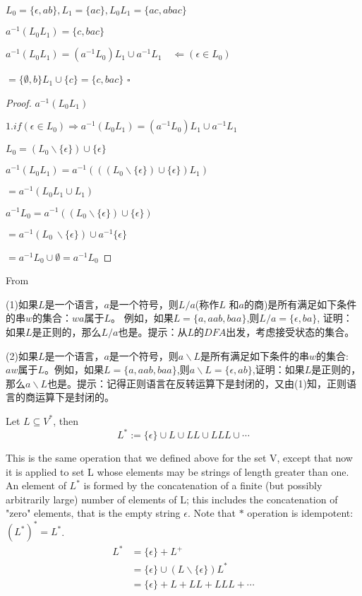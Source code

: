 \begin{example}
	$L_0 = \{\epsilon,ab\},L_1 = \{ac\}, L_0L_1 = \{ac,abac\}$
	
	$a^{-1}(L_0L_1) = \{c,bac\}$
	
	$a^{-1}(L_0L_1) = (a^{-1}L_0)L_1 \cup a^{-1}L_1 \quad\Leftarrow(\epsilon \in L_0)$
	
	$= \{\emptyset,b\}L_1 \cup \{c\} = \{c,bac\}$ \hfill$\square$
\end{example}

\begin{proof}
	$a^{-1}(L_0L_1)$
	
	$1. if(\epsilon \in L_0) \Rightarrow a^{-1}(L_0L_1) = (a^{-1}L_0)L_1 \cup a^{-1}L_1 $
	
	$L_0 = (L_0 \backslash \{\epsilon\}) \cup \{\epsilon\}$
	
	$a^{-1}(L_0L_1) = a^{-1}(((L_0 \backslash \{\epsilon\}) \cup \{\epsilon\})L_1)$
	
	$=a^{-1}(L_0L_1\cup L_1)$
	
	$a^{-1}L_0 = a^{-1}((L_0 \backslash \{\epsilon\}) \cup \{\epsilon\})$
	
	$=a^{-1}(L_0\ \backslash \{\epsilon \}) \cup a^{-1}\{\epsilon \}$
	
	$=a^{-1}L_0 \cup \emptyset = a^{-1}L_0$
\end{proof}
	

\clearpage

From \cite[p99]{Hopcroft2008}

(1)如果$L$是一个语言，$a$是一个符号，则$L/a$(称作$L$ 和$a$的商)是所有满足如下条件的串$w$的集合：$wa$属于$L$。
例如，如果$L=\{a,aab,baa\}$,则$L/a = \{\epsilon,ba\}$, 证明：如果$L$是正则的，那么$L/a$也是。提示：从$L$的$DFA$出发，考虑接受状态的集合。

(2)如果$L$是一个语言，$a$是一个符号，则$a\backslash L$是所有满足如下条件的串$w$的集合: $aw$属于$L$。例如，如果$L=\{a,aab,baa\}$,则$a\backslash L=\{\epsilon,ab\}$,证明：如果$L$是正则的，那么$a\backslash L$也是。提示：记得正则语言在反转运算下是封闭的，又由(1)知，正则语言的商运算下是封闭的。

\begin{definition}
	Let $L\subseteq V^{\ast}$, then
	$$L^{\ast} := \{\epsilon\}\cup L \cup LL\cup LLL\cup \cdots$$
\end{definition}

This is the same operation that we defined above for the set V, except that now it is applied to set L whose elements may be strings of length greater than one. An element of $L^*$ is formed by the concatenation of a finite (but possibly arbitrarily large) number of elements of L; this includes the concatenation of "zero" elements, that is the empty string $\epsilon$. Note that $\ast$ operation is idempotent: ${(L^*)}^* = L^*$.
\begin{align*}
L^{\ast} &= \{\epsilon\} +L^{+} \\
&=  \{\epsilon\}\cup (L\backslash \{\epsilon\})L^{\ast}\\ &=\{\epsilon\} + L + LL + LLL + \cdots
\end{align*}

